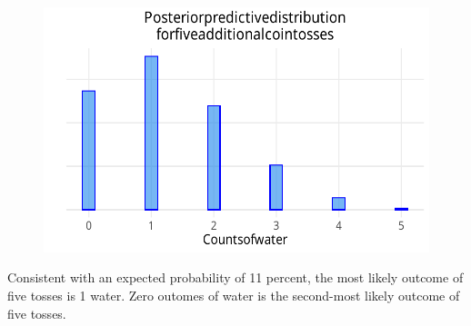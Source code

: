 \documentclass[
  letterpaper,
  DIV=11,
  numbers=noendperiod,
  oneside]{scrartcl}
\begin{document}
\begin{figure}[H]

{\centering \includegraphics{rethinking2024wk1_files/figure-pdf/unnamed-chunk-20-1.pdf}

}

\end{figure}

Consistent with an expected probability of 11 percent, the most likely
outcome of five tosses is 1 water. Zero outomes of water is the
second-most likely outcome of five tosses.
\end{document}
